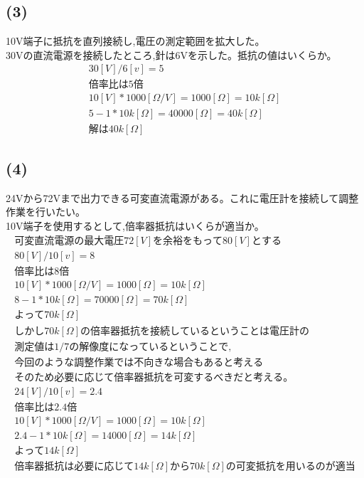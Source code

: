 \documentclass[titlepage]{jarticle}
\begin{document}
\subsection{(3)}
10V端子に抵抗を直列接続し,電圧の測定範囲を拡大した。\\
30Vの直流電源を接続したところ,針は6Vを示した。抵抗の値はいくらか。
\begin{eqnarray}
    30[V]/6[v]=5 \nonumber\\
    倍率比は5倍 \nonumber\\
    10[V]*1000[Ω/V]=1000[Ω]=10k[Ω] \nonumber\\
    5-1*10k[Ω]=40000[Ω]=40k[Ω]\nonumber\\
    解は40k[Ω]\nonumber
\end{eqnarray}
\subsection{(4)}
24Vから72Vまで出力できる可変直流電源がある。これに電圧計を接続して調整作業を行いたい。\\
10V端子を使用するとして,倍率器抵抗はいくらが適当か。
\begin{eqnarray}
    可変直流電源の最大電圧72[V]を余裕をもって80[V]とする \nonumber\\
    80[V]/10[v]=8 \nonumber\\
    倍率比は8倍 \nonumber\\
    10[V]*1000[Ω/V]=1000[Ω]=10k[Ω] \nonumber\\
    8-1*10k[Ω]=70000[Ω]=70k[Ω]\nonumber\\
    よって70k[Ω]\nonumber\\
    しかし70k[Ω]の倍率器抵抗を接続しているということは電圧計の\nonumber\\
    測定値は1/7の解像度になっているということで,\nonumber\\
    今回のような調整作業では不向きな場合もあると考える\nonumber\\
    そのため必要に応じて倍率器抵抗を可変するべきだと考える。\nonumber\\
    24[V]/10[v]=2.4 \nonumber\\
    倍率比は2.4倍 \nonumber\\
    10[V]*1000[Ω/V]=1000[Ω]=10k[Ω] \nonumber\\
    2.4-1*10k[Ω]=14000[Ω]=14k[Ω]\nonumber\\
    よって14k[Ω]\nonumber\\
    倍率器抵抗は必要に応じて14k[Ω]から70k[Ω]の可変抵抗を用いるのが適当\nonumber
\end{eqnarray}
\end{document}
